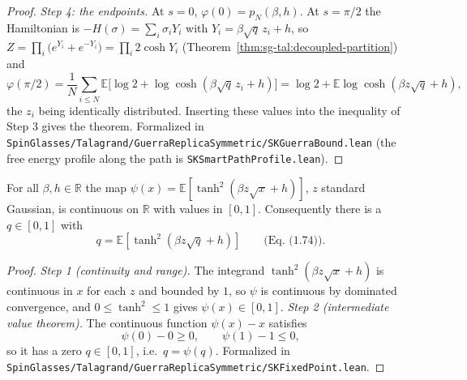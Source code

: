 \begin{proof}
\emph{Step 4: the endpoints.} At $s=0$, $\varphi(0)=p_N(\beta,h)$. At $s=\pi/2$ the Hamiltonian is $-H(\sigma)=\sum_i\sigma_iY_i$ with $Y_i=\beta\sqrt q\,z_i+h$, so $Z=\prod_i\big(e^{Y_i}+e^{-Y_i}\big)=\prod_i2\cosh Y_i$ (Theorem~\ref{thm:sg-tal:decoupled-partition}) and
\[
\varphi(\pi/2)=\frac1N\sum_{i\le N}\mathbb{E}\big[\log2+\log\cosh(\beta\sqrt q\,z_i+h)\big]=\log2+\mathbb{E}\log\cosh(\beta z\sqrt q+h),
\]
the $z_i$ being identically distributed. Inserting these values into the inequality of Step 3 gives the theorem.
Formalized in \texttt{SpinGlasses/Talagrand/GuerraReplicaSymmetric/SKGuerraBound.lean} (the free energy profile along the path is \texttt{SKSmartPathProfile.lean}).
\end{proof}

\begin{theorem}\label{thm:sg-tal:fixed-point}
  \leanok
{}
For all $\beta,h\in\mathbb R$ the map $\psi(x)=\mathbb{E}[\tanh^2(\beta z\sqrt x+h)]$, $z$ standard Gaussian, is continuous on $\mathbb R$ with values in $[0,1]$. Consequently there is a $q\in[0,1]$ with
\[
q=\mathbb{E}[\tanh^2(\beta z\sqrt q+h)]\qquad\text{(Eq.~(1.74))}.
\]
\end{theorem}
\begin{proof}
  \leanok
\emph{Step 1 (continuity and range).} The integrand $\tanh^2(\beta z\sqrt x+h)$ is continuous in $x$ for each $z$ and bounded by $1$, so $\psi$ is continuous by dominated convergence, and $0\le\tanh^2\le1$ gives $\psi(x)\in[0,1]$.
\emph{Step 2 (intermediate value theorem).} The continuous function $\psi(x)-x$ satisfies
\[
\psi(0)-0\ge0,\qquad\psi(1)-1\le0,
\]
so it has a zero $q\in[0,1]$, i.e.\ $q=\psi(q)$.
Formalized in \texttt{SpinGlasses/Talagrand/GuerraReplicaSymmetric/SKFixedPoint.lean}.
\end{proof}


